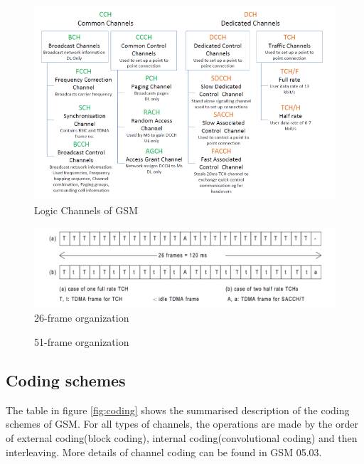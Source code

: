 \documentclass[a4paper,12pt,oneside]{article}
\begin{document}
\begin{figure}[h]
\centering\includegraphics[width=5in]{figure/log_ch.png}
\caption{Logic Channels of GSM \label{fig:2} \cite{glendrange2010decoding}}
\end{figure}
\begin{figure}[h]
\centering\includegraphics[width=5in]{figure/26frames.png}
\caption{ 26-frame organization\label{fig:26f} \cite{etsi199203}}
\end{figure}

\newpage
\begin{figure}[h]

\caption{ 51-frame organization\label{fig:51f} \cite{etsi199203}}
\end{figure}

\newpage


\subsection{Coding schemes}
The table in figure \ref{fig:coding} shows the summarised description of the coding schemes of GSM. 
For all types of channels, the operations are made by the order of external coding(block coding), internal 
coding(convolutional coding) and then interleaving. More details of channel coding can be found in GSM 05.03\cite{etsi199203_chn}.
\end{document}
